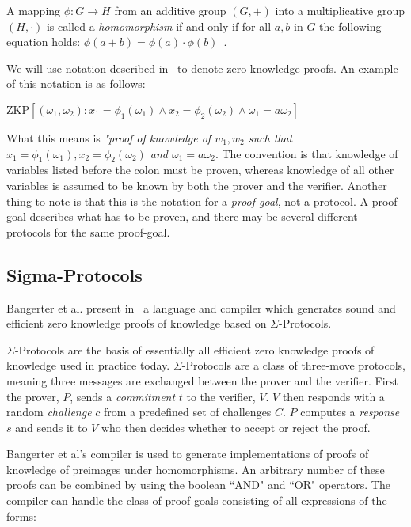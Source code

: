 \documentclass{sig-alternate}
\begin{document}
	A mapping $\phi : G \rightarrow H$ from an additive group $(G, +)$ into a
	multiplicative group $(H, \cdot)$ is called a \textit{homomorphism} if and
	only if for all $a, b$ in $G$ the following equation holds: $\phi(a + b) =
	\phi(a) \cdot \phi(b)$~\cite{Sigma:2009}.
	
	We will use notation described in~\cite{Sigma:2009} to denote zero knowledge
	proofs. An example of this notation is as follows:
	
	\begin{center}
		$\text{ZKP}[(\omega_{1},\omega_{2}):x_{1} = \phi_{1}(\omega_{1}) \land  x_{2} = \phi_{2}(\omega_{2}) \land \omega_{1} = a\omega_{2}]$ 
	\end{center}
	
	What this means is \textit{"proof of knowledge of $w_{1}, w_{2}$ such that 
	$x_{1} = \phi_{1}(\omega_{1}), x_{2} = \phi_{2}(\omega_{2})$ and $\omega_{1} = a\omega_{2}$}.
	The convention is that knowledge of variables listed before the colon
	must be proven, whereas knowledge of all other variables is
	assumed to be known by both the prover and the verifier. Another thing
	to note is that this is the notation for a \textit{proof-goal}, not
	a protocol. A proof-goal describes what has to be proven, and there may
	be several different protocols for the same proof-goal.

	\subsection{Sigma-Protocols}
		Bangerter et al. present in~\cite{Sigma:2009} a language and compiler
		which generates sound and efficient zero knowledge proofs of knowledge
		based on $\Sigma$-Protocols.	
	
		$\Sigma$-Protocols are the basis of essentially all efficient zero knowledge
		proofs of knowledge used in practice today. $\Sigma$-Protocols are a class of
		three-move protocols, meaning three messages are exchanged between the prover
		and the verifier. First the prover, $P$, sends a \textit{commitment} $t$ to the
		verifier, $V$. $V$ then responds with a random \textit{challenge} $c$ from a 
		predefined set of challenges $C$. $P$ computes a \textit{response} $s$ and sends
		it to $V$ who then decides whether to accept or reject the proof.
		
		Bangerter et al's compiler is used to generate implementations of proofs
		of knowledge of preimages under homomorphisms. An arbitrary number of these
		proofs can be combined by using the boolean ``AND" and ``OR" operators.
		The compiler can handle the class of proof goals consisting of
		all expressions of the forms:
		
\end{document}
